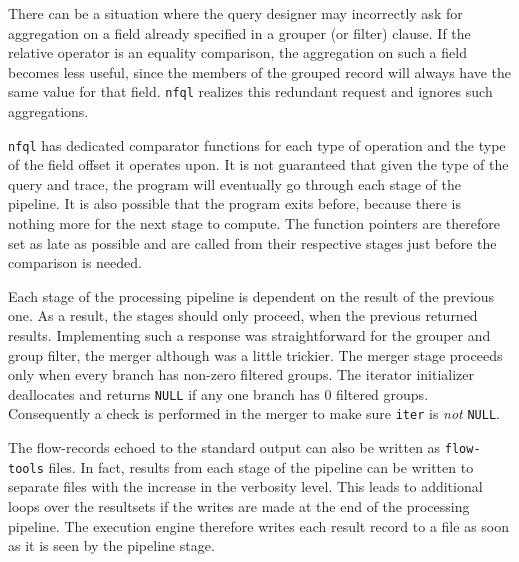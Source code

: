 There can be a situation where the query designer may incorrectly ask for
aggregation on a field already specified in a grouper (or filter) clause. If
the relative operator is an equality comparison, the aggregation on such a
field becomes less useful, since the members of the grouped record will always
have the same value for that field. \texttt{nfql} realizes this redundant
request and ignores such aggregations.

\texttt{nfql} has dedicated comparator functions for each type of operation
and the type of the field offset it operates upon. It is not guaranteed that
given the type of the query and trace, the program will eventually go through
each stage of the pipeline. It is also possible that the program exits before,
because there is nothing more for the next stage to compute. The function
pointers are therefore set as late as possible and are called from their
respective stages just before the comparison is needed.

Each stage of the processing pipeline is dependent on the result of the
previous one. As a result, the stages should only proceed, when the previous
returned results. Implementing such a response was straightforward for the
grouper and group filter, the merger although was a little trickier.  The
merger stage proceeds only when every branch has non-zero filtered groups.
The iterator initializer deallocates and returns \texttt{NULL} if any one
branch has $0$ filtered groups.  Consequently a check is performed in the
merger to make sure \texttt{iter} is \emph{not} \texttt{NULL}.

The flow-records echoed to the standard output can also be written as
\texttt{flow-tools} files. In fact, results from each stage of the pipeline
can be written to separate files with the increase in the verbosity level.
This leads to additional loops over the resultsets if the writes are made at
the end of the processing pipeline. The execution engine therefore writes each
result record to a file as soon as it is seen by the pipeline stage.
